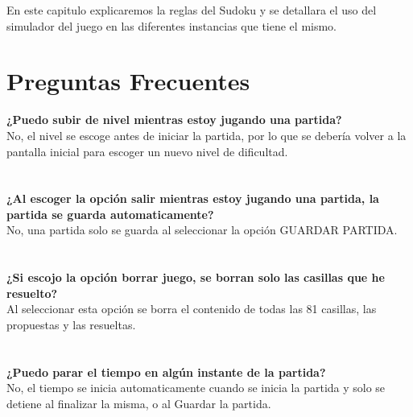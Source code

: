 \documentclass[12pt,oneside]{book}
\begin{document}
En este capitulo explicaremos la reglas del Sudoku y se detallara el uso del simulador del juego en las diferentes instancias que tiene el mismo. 






\chapter{Preguntas Frecuentes}

\begin{center}

\textbf{¿Puedo subir de nivel mientras estoy jugando una partida?} \\ No, el nivel se escoge antes de iniciar la partida, por lo que se debería volver a la pantalla inicial para escoger un nuevo nivel de dificultad.
\ \\ \ \\ \ \\

\textbf{¿Al escoger la opción salir mientras estoy jugando una partida, la partida se guarda automaticamente?} \\ No, una partida solo se guarda al seleccionar la opción GUARDAR PARTIDA.
\ \\ \ \\ \ \\

\textbf{¿Si escojo la opción borrar juego, se borran solo las casillas que he resuelto?} \\ Al seleccionar esta opción se borra el contenido de todas las 81 casillas, las propuestas y las resueltas.
\ \\ \ \\ \ \\

\textbf{¿Puedo parar el tiempo en algún instante de la partida?} \\ No, el tiempo se inicia automaticamente cuando se inicia la partida y solo se detiene al finalizar la misma, o al Guardar la partida.


\end{center}
\end{document}
